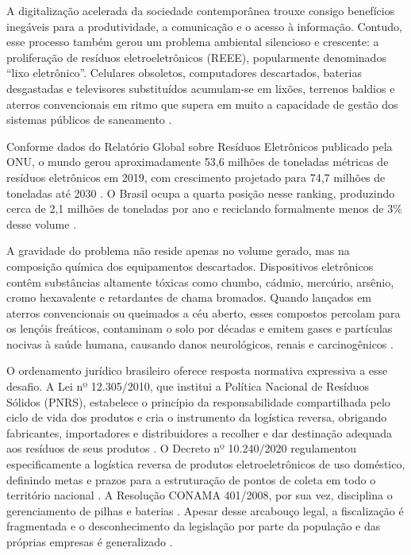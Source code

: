 \documentclass[12pt, a4paper]{article}
\numberwithin{equation}{section}
\numberwithin{figure}{section}
\numberwithin{table}{section}
\begin{document}
A digitalização acelerada da sociedade contemporânea trouxe consigo benefícios
inegáveis para a produtividade, a comunicação e o acesso à informação. Contudo,
esse processo também gerou um problema ambiental silencioso e crescente:
a proliferação de resíduos eletroeletrônicos (REEE), popularmente denominados
``lixo eletrônico''. Celulares obsoletos, computadores descartados, baterias
desgastadas e televisores substituídos acumulam-se em lixões, terrenos baldios
e aterros convencionais em ritmo que supera em muito a capacidade de gestão dos
sistemas públicos de saneamento \cite{abrelpe2023}.

Conforme dados do Relatório Global sobre Resíduos Eletrônicos publicado pela
ONU, o mundo gerou aproximadamente 53,6 milhões de toneladas métricas de
resíduos eletrônicos em 2019, com crescimento projetado para 74,7 milhões de
toneladas até 2030 \cite{forti2020}. O Brasil ocupa a quarta posição nesse
ranking, produzindo cerca de 2,1 milhões de toneladas por ano e reciclando
formalmente menos de 3\% desse volume \cite{abrelpe2023}.

A gravidade do problema não reside apenas no volume gerado, mas na composição
química dos equipamentos descartados. Dispositivos eletrônicos contêm substâncias
altamente tóxicas como chumbo, cádmio, mercúrio, arsênio, cromo hexavalente e
retardantes de chama bromados. Quando lançados em aterros convencionais ou
queimados a céu aberto, esses compostos percolam para os lençóis freáticos,
contaminam o solo por décadas e emitem gases e partículas nocivas à saúde
humana, causando danos neurológicos, renais e carcinogênicos
\cite{baldé2017, singh2020}.

O ordenamento jurídico brasileiro oferece resposta normativa expressiva a esse
desafio. A Lei nº 12.305/2010, que institui a Política Nacional de Resíduos
Sólidos (PNRS), estabelece o princípio da responsabilidade compartilhada pelo
ciclo de vida dos produtos e cria o instrumento da logística reversa,
obrigando fabricantes, importadores e distribuidores a recolher e dar destinação
adequada aos resíduos de seus produtos \cite{brasil2010pnrs}. O Decreto nº
10.240/2020 regulamentou especificamente a logística reversa de produtos
eletroeletrônicos de uso doméstico, definindo metas e prazos para a estruturação
de pontos de coleta em todo o território nacional \cite{brasil2020decreto}. A
Resolução CONAMA 401/2008, por sua vez, disciplina o gerenciamento de pilhas
e baterias \cite{conama401}. Apesar desse arcabouço legal, a fiscalização é
fragmentada e o desconhecimento da legislação por parte da população e das
próprias empresas é generalizado \cite{moreira2019}.
\end{document}
